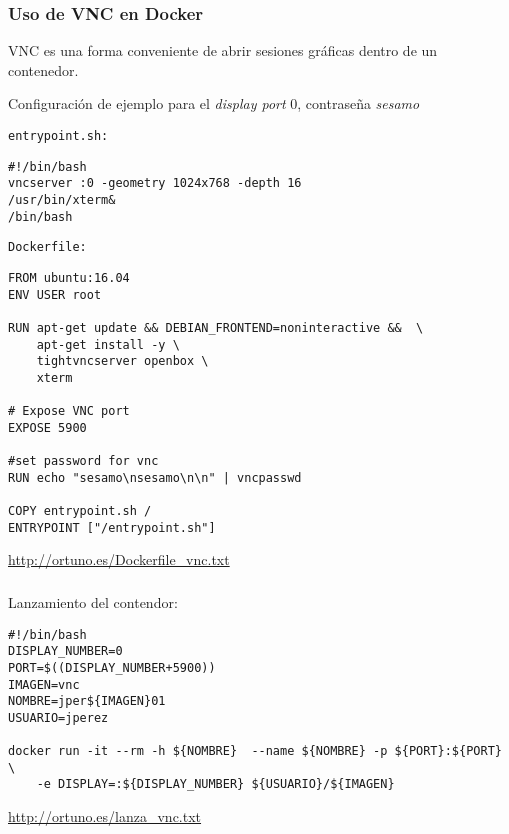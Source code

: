 \documentclass[ucs]{beamer}
\begin{document}
\begin{frame}[fragile]
\frametitle{Uso de VNC en Docker}
VNC es una forma conveniente de abrir sesiones gráficas dentro de un contenedor.

Configuración de ejemplo para el 
\emph{display port} 0, contraseña 
\emph{sesamo}

\verb|entrypoint.sh:|

  \begin{scriptsize}
  \begin{verbatim}
#!/bin/bash
vncserver :0 -geometry 1024x768 -depth 16
/usr/bin/xterm&
/bin/bash
  \end{verbatim}
  \end{scriptsize}


\end{frame}
\begin{frame}[fragile]

\verb|Dockerfile:|

  \begin{scriptsize}
  \begin{verbatim}
FROM ubuntu:16.04
ENV USER root

RUN apt-get update && DEBIAN_FRONTEND=noninteractive &&  \
    apt-get install -y \
    tightvncserver openbox \
    xterm

# Expose VNC port
EXPOSE 5900

#set password for vnc
RUN echo "sesamo\nsesamo\n\n" | vncpasswd

COPY entrypoint.sh /
ENTRYPOINT ["/entrypoint.sh"]
  \end{verbatim}
  \end{scriptsize}

\begin{tiny}
\begin{flushright}
\url{http://ortuno.es/Dockerfile_vnc.txt}
\end{flushright}
\end{tiny}
\end{frame}


\begin{frame}[fragile]
\frametitle{}
Lanzamiento del contendor:

  \begin{scriptsize}
  \begin{verbatim}
#!/bin/bash
DISPLAY_NUMBER=0
PORT=$((DISPLAY_NUMBER+5900))
IMAGEN=vnc
NOMBRE=jper${IMAGEN}01
USUARIO=jperez

docker run -it --rm -h ${NOMBRE}  --name ${NOMBRE} -p ${PORT}:${PORT} \
    -e DISPLAY=:${DISPLAY_NUMBER} ${USUARIO}/${IMAGEN}
  \end{verbatim}
  \end{scriptsize}

\begin{tiny}
\begin{flushright}
\url{http://ortuno.es/lanza_vnc.txt}
\end{flushright}
\end{tiny}
\end{frame}


\end{document}
